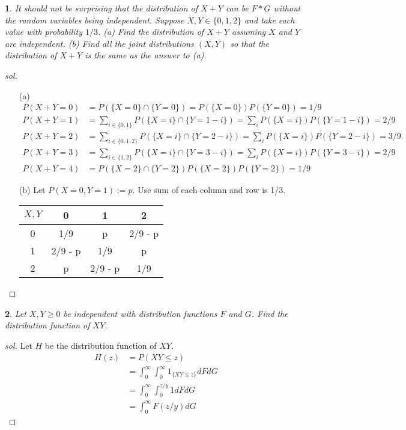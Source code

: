 \documentclass{report}
\newtheorem{ex}{}[section]
\begin{document}
\begin{ex}
It should not be surprising that the distribution of $X+Y$ can be $F*G$ without the random variables being independent. Suppose $X,Y \in \{0,1,2\}$ and take each value with probability $1/3$. (a) Find the distribution of $X+Y$ assuming $X$ and $Y$ are independent. (b) Find all the joint distributions $(X,Y)$ so that the distribution of $X+Y$ is the same as the answer to (a).
\end{ex}
\begin{proof}[sol]~
\begin{enumerate}
    \item[(a)] 
        \begin{align*}
        P(X+Y = 0) &= P(\{X = 0\}\cap\{Y = 0\}) =P(\{X = 0\})P(\{Y = 0\}) = 1/9\\
        P(X+Y = 1) &= \sum_{i\in\{0,1\}} P(\{X = i\}\cap\{Y = 1-i\})= \sum_i P(\{X = i\})P(\{Y = 1-i\}) = 2/9\\
        P(X+Y = 2) &= \sum_{i\in\{0,1,2\}} P(\{X = i\}\cap\{Y = 2-i\})= \sum_i P(\{X = i\})P(\{Y = 2-i\}) = 3/9\\
        P(X+Y = 3) &=\sum_{i\in\{1,2\}} P(\{X = i\}\cap\{Y = 3-i\})= \sum_i P(\{X = i\})P(\{Y = 3-i\}) = 2/9\\
        P(X+Y = 4) &= P(\{X = 2\}\cap\{Y = 2\}) P(\{X = 2\})P(\{Y = 2\}) = 1/9
        \end{align*}
    \item[(b)] Let $P(X = 0, Y = 1) := p$. Use sum of each column and row is 1/3.
    
    \begin{table}[h]
    \centering
	\begin{tabular}{c|ccc}
	 $X, Y$& 0 & 1 & 2 \\ \hline
	 0&  1/9&  p& 2/9 - p \\
	 1& 2/9 - p &  1/9 &  p\\
	 2&  p& 2/9 - p &1/9 
	\end{tabular}
	\end{table}
\end{enumerate}
\end{proof}
\begin{ex}
Let $X,Y \ge 0$ be independent with distribution functions $F$ and $G$. Find the distribution function of $XY$.
\end{ex}
\begin{proof}[sol]
Let $H$ be the distribution function of $XY$.
\begin{align*}
    H(z) &= P(XY \le z)\\
    &=\int_0^\infty\int_0^\infty 1_{\{XY \le z\}} dFdG\\
    &=\int_0^\infty\int_{0}^{z/y}1dFdG\\
    &=\int_0^\infty F(z/y)dG
\end{align*}
\end{proof}
\end{document}
